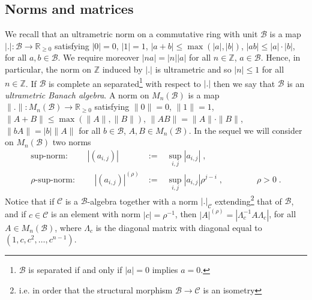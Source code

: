 \documentclass{compositio}
\numberwithin{equation}{section}
\begin{document}
\subsection{Norms and matrices} 
We recall that an ultrametric norm on a commutative ring with unit ${\mathscr{B}}$ is a map 
$|.|:{\mathscr{B}}\to\mathbb{R}_{\geq 0}$ satisfying $|0|=0$, $|1|=1$, $|a+b|\leq\max(|a|,|b|)$, 
$|ab|\leq|a|\cdot|b|$, for all $a,b\in {\mathscr{B}}$. We require moreover $|na|=|n||a|$ for all $n\in\mathbb{Z}$, $a\in{\mathscr{B}}$.  
Hence, in particular, the norm on $\mathbb{Z}$ induced by $|.|$ is ultrametric and so $|n|\leq 1$ for all 
$n\in\mathbb{Z}$. If ${\mathscr{B}}$ is complete an separated\footnote{${\mathscr{B}}$ is separated if and only if $|a|=0$ implies $a=0$.} 
with respect to $|.|$ then we say that ${\mathscr{B}}$ is 
an \emph{ultrametric Banach algebra}. 
A norm on $M_n({\mathscr{B}})$ is a map $\|.\|:M_n({\mathscr{B}})\to\mathbb{R}_{\geq 0}$ satisfying $\|0\|=0$, $\|1\|=1$, 
$\|A+B\|\leq\max(\|A\|,\|B\|)$, $\|AB\|=\|A\|\cdot\|B\|$, $\|bA\|=|b|\|A\|$ for all $b\in{\mathscr{B}}$, $A,B\in M_n({\mathscr{B}})$. 
In the sequel we will consider on $M_n({\mathscr{B}})$ two norms 
\begin{eqnarray}
\textrm{sup-norm: }
\qquad|(a_{i,j})|\phantom{^{(\rho)}}&\;:=\;&\sup_{i,j}|a_{i,j}|\;,\label{norm sup on matrices}\\
\rho\textrm{-sup-norm: }
\qquad|(a_{i,j})|^{(\rho)}&\;:=\;&\sup_{i,j}|a_{i,j}|\rho^{j-i}\;,\qquad\qquad\rho>0\;.\label{norm rho on 
matrices}
\end{eqnarray}
Notice that if $\mathscr{C}$ is a ${\mathscr{B}}$-algebra together with a norm $|.|_{\mathscr{C}}$ 
extending\footnote{i.e. in order that the structural morphism ${\mathscr{B}}\to\mathscr{C}$ is an isometry} 
that of ${\mathscr{B}}$, and if $c\in\mathscr{C}$ is an element with norm $|c|=\rho^{-1}$, 
then $|A|^{(\rho)}=|\Lambda_c^{-1}A\Lambda_c|$, for all $A\in M_n({\mathscr{B}})$, where $\Lambda_c$ is 
the diagonal matrix with diagonal equal to $(1,c,c^2,\ldots,c^{n-1})$.
 
\end{document}
